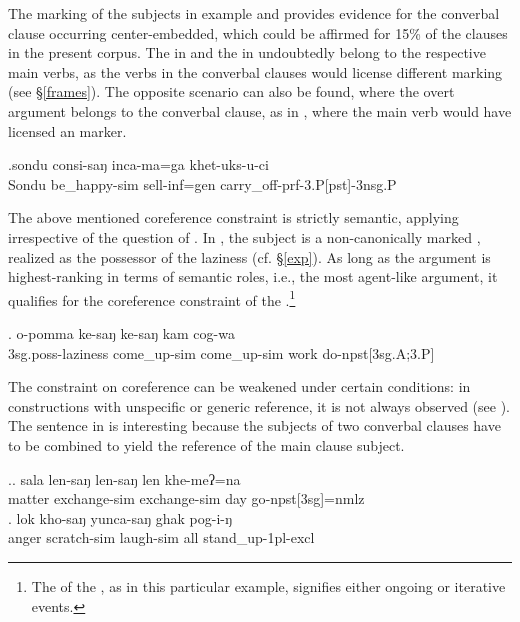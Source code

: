 The  marking of the subjects in example \Last[a] and \Last[c] provides evidence for the converbal clause occurring center-embedded, which could be affirmed for 15\% of the  clauses in the present corpus. The   in \Last[a] and the   in  \Last[c] undoubtedly belong to the respective  main verbs, as the verbs in the converbal clauses would license different  marking (see §\ref{frames}). The opposite scenario can also be found, where the overt argument belongs to the converbal clause, as in  \Next, where the main verb would have licensed an   marker.  

\exg.sondu  consi-saŋ  inca-ma=ga    khet-uks-u-ci\\
Sondu   be\_happy{\sc -sim} sell{\sc -inf=gen} carry\_off{\sc -prf-3.P[pst]-3nsg.P}\\
 


The above mentioned coreference constraint is strictly semantic, applying irrespective of the question of . In \Next, the subject is a non-canonically marked , realized as the possessor of the laziness (cf. §\ref{exp}). As long as the argument is highest-ranking in terms of semantic roles, i.e., the  most agent-like argument, it qualifies for the coreference constraint of the .\footnote{The  of the , as in this particular example, signifies either ongoing or iterative events.}

\exg.	o-pomma ke-saŋ ke-saŋ kam cog-wa\\
	{\sc 3sg.poss-}laziness come\_up-{\sc sim} come\_up-{\sc sim} work do{\sc -npst[3sg.A;3.P]}\\
		
The constraint on coreference can be weakened under certain conditions: in constructions with unspecific or generic reference, it is not always observed (see \Next[a]). The sentence in \Next[b] is interesting because the subjects of two converbal clauses have to be combined to yield the reference of the main clause subject. 

\ex.\ag.	sala len-saŋ len-saŋ len khe-meʔ=na\\
		matter exchange-{\sc sim} exchange-{\sc sim} day   go{\sc -npst[3sg]=nmlz}\\
		\bg.  lok kho-saŋ                 yunca-saŋ              ghak pog-i-ŋ\\
		anger scratch{\sc -sim} laugh{\sc -sim} all stand\_up{\sc -1pl-excl}\\
		 
		
